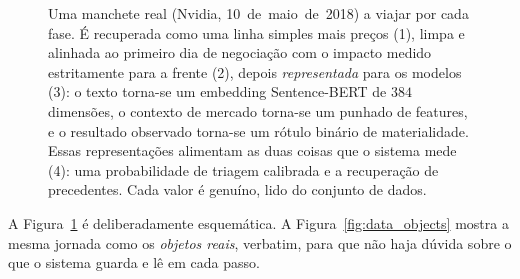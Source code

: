 \begin{figure}[ht]
\caption[Uma manchete real por todo o sistema]{Uma manchete real (Nvidia, 10~de~maio~de~2018) a viajar por
cada fase. É recuperada como uma linha simples mais preços (1), limpa e alinhada ao primeiro dia de
negociação com o impacto medido estritamente para a frente (2), depois \emph{representada} para os modelos
(3): o texto torna-se um embedding Sentence-BERT de $384$ dimensões, o contexto de mercado torna-se um
punhado de features, e o resultado observado torna-se um rótulo binário de materialidade. Essas
representações alimentam as duas coisas que o sistema mede (4): uma probabilidade de triagem calibrada e a
recuperação de precedentes. Cada valor é genuíno, lido do conjunto de dados.}
\label{fig:data_journey}
\end{figure}

A Figura~\ref{fig:data_journey} é deliberadamente esquemática. A Figura~\ref{fig:data_objects} mostra a
mesma jornada como os \emph{objetos reais}, verbatim, para que não haja dúvida sobre o que o sistema guarda
e lê em cada passo.

